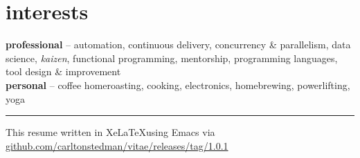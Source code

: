 \documentclass[]{vitae-cv}
\begin{document}

\section{interests}

\textbf{professional} -- automation, continuous delivery, concurrency
\& parallelism, data science, \emph{kaizen}, functional programming, mentorship, programming languages,
tool design \& improvement \\
\textbf{personal} -- coffee homeroasting, cooking, electronics, homebrewing,
powerlifting, yoga

\rule{\linewidth}{.25pt}

\small{This resume written in Xe\LaTeX using Emacs via \href{
    https://github.com/carltonstedman/vitae/releases/tag/1.0.1}{
    github.com/carltonstedman/vitae/releases/tag/1.0.1}}
\end{document}
